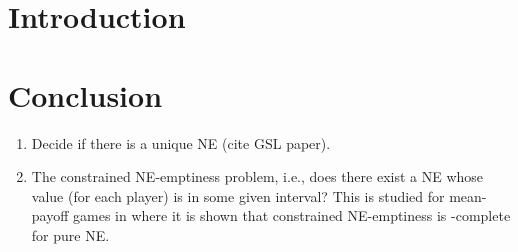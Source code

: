 \documentclass{article}
\begin{document}
\clearpage

\maketitle

\section{Introduction}








\section{Conclusion}

\begin{enumerate}
 \item Decide if there is a unique NE (cite GSL paper).
 \item The constrained NE-emptiness problem, i.e., does there exist a NE whose value (for each player) is in some given interval? This is studied for mean-payoff games in \cite{DBLP:journals/corr/abs-1109-6220} where it is shown that constrained NE-emptiness is \np-complete for pure NE.
\end{enumerate}






\end{document}
